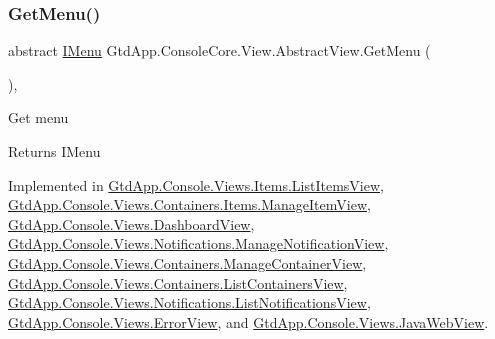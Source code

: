 \mbox{\label{class_gtd_app_1_1_console_core_1_1_view_1_1_abstract_view_a04360e549fc462f357300c59fa7fadab}} 
\subsubsection{\texorpdfstring{Get\+Menu()}{GetMenu()}}
{\footnotesize\ttfamily abstract \mbox{\hyperlink{interface_gtd_app_1_1_console_core_1_1_menu_1_1_i_menu}{I\+Menu}} Gtd\+App.\+Console\+Core.\+View.\+Abstract\+View.\+Get\+Menu (\begin{DoxyParamCaption}{ }\end{DoxyParamCaption})\hspace{0.3cm}{\ttfamily [protected]}, {}}



Get menu 

\begin{DoxyReturn}{Returns}
I\+Menu
\end{DoxyReturn}


Implemented in \mbox{\hyperlink{class_gtd_app_1_1_console_1_1_views_1_1_items_1_1_list_items_view_a0abb0cf4929790758e9178e93b2935e6}{Gtd\+App.\+Console.\+Views.\+Items.\+List\+Items\+View}}, \mbox{\hyperlink{class_gtd_app_1_1_console_1_1_views_1_1_containers_1_1_items_1_1_manage_item_view_aeda5fd8190bc8ddc7c735d87c396f392}{Gtd\+App.\+Console.\+Views.\+Containers.\+Items.\+Manage\+Item\+View}}, \mbox{\hyperlink{class_gtd_app_1_1_console_1_1_views_1_1_dashboard_view_a2e6ef17223902830997ae979443dbfc0}{Gtd\+App.\+Console.\+Views.\+Dashboard\+View}}, \mbox{\hyperlink{class_gtd_app_1_1_console_1_1_views_1_1_notifications_1_1_manage_notification_view_a2baf4336e970b64dd3c286820fe12fae}{Gtd\+App.\+Console.\+Views.\+Notifications.\+Manage\+Notification\+View}}, \mbox{\hyperlink{class_gtd_app_1_1_console_1_1_views_1_1_containers_1_1_manage_container_view_aea83be4f40d02624136c8e0884f10d0b}{Gtd\+App.\+Console.\+Views.\+Containers.\+Manage\+Container\+View}}, \mbox{\hyperlink{class_gtd_app_1_1_console_1_1_views_1_1_containers_1_1_list_containers_view_a25bfb63f79fb2b356450cf5bb59e1772}{Gtd\+App.\+Console.\+Views.\+Containers.\+List\+Containers\+View}}, \mbox{\hyperlink{class_gtd_app_1_1_console_1_1_views_1_1_notifications_1_1_list_notifications_view_a00c293c9f8f20a6b9bd75886178a6dae}{Gtd\+App.\+Console.\+Views.\+Notifications.\+List\+Notifications\+View}}, \mbox{\hyperlink{class_gtd_app_1_1_console_1_1_views_1_1_error_view_a6073e05c80db775ba86986c8a068df87}{Gtd\+App.\+Console.\+Views.\+Error\+View}}, and \mbox{\hyperlink{class_gtd_app_1_1_console_1_1_views_1_1_java_web_view_ad7e12e20b33449a8f0b95dbcf47c4602}{Gtd\+App.\+Console.\+Views.\+Java\+Web\+View}}.

